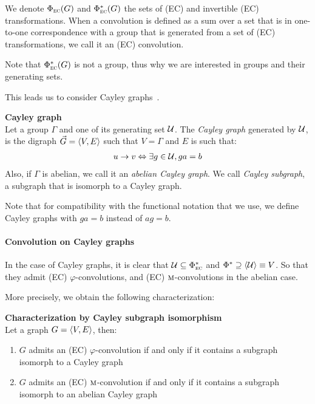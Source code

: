 We denote $\Phi_{\operatorname{\textsc{ec}}}(G)$ and $\Phi^*_{\operatorname{\textsc{ec}}}(G)$ the sets of (EC) and invertible (EC) transformations. When a convolution is defined as a sum over a set that is in one-to-one correspondence with a group that is generated from a set of (EC) transformations, we call it an (EC) convolution.

\begin{remark}
Note that $\Phi^*_{\operatorname{\textsc{ec}}}(G)$ is not a group, thus why we are interested in groups and their generating sets.
\end{remark}

This leads us to consider Cayley graphs~\citep{cayley1878desiderata,wiki:cayley}.

\begin{definition}\textbf{Cayley graph}\\
Let a group $\Gamma$ and one of its generating set $\mathcal{U}$. The \emph{Cayley graph} generated by $\mathcal{U}$, is the digraph $\vec{G} = \langle V, E \rangle$ such that $V = \Gamma$ and $E$ is such that:
\begin{gather*}
u \rightarrow v \Leftrightarrow \exists g \in \mathcal{U}, ga = b
\end{gather*}
Also, if $\Gamma$ is abelian, we call it an \emph{abelian Cayley graph}. We call \emph{Cayley subgraph}, a subgraph that is isomorph to a Cayley graph.
\end{definition}

\begin{remark}
Note that for compatibility with the functional notation that we use, we define Cayley graphs with $ga = b$ instead of $ag = b$.
\end{remark}

\paragraph{Convolution on Cayley graphs}
In the case of Cayley graphs, it is clear that $\mathcal{U} \subseteq \Phi^*_{\operatorname{\textsc{ec}}}$ and $\Phi^* \supseteq \langle \mathcal{U} \rangle \equiv V$. So that they admit (EC) $\varphi$-convolutions, and (EC) $\operatorname{\textsc{m}}$-convolutions in the abelian case.

More precisely, we obtain the following characterization:

\begin{proposition}\textbf{Characterization by Cayley subgraph isomorphism}\\
\label{prop:chc}
Let a graph $G = \langle V, E \rangle$, then:
\begin{enumerate}[label=(\roman*)]
\item $G$ admits an (EC) $\varphi$-convolution if and only if it contains a subgraph isomorph to a Cayley graph
\item $G$ admits an (EC) $\operatorname{\textsc{m}}$-convolution if and only if it contains a subgraph isomorph to an abelian Cayley graph
\end{enumerate}
\end{proposition}

